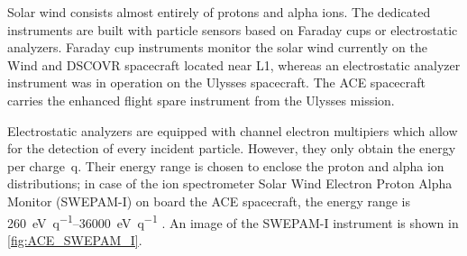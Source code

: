 Solar wind consists almost entirely of protons and alpha ions. The dedicated instruments are built with particle sensors based on Faraday cups or electrostatic analyzers. Faraday cup instruments monitor the solar wind currently on the Wind and DSCOVR spacecraft located near L1, whereas an electrostatic analyzer instrument was in operation on the Ulysses spacecraft. The ACE spacecraft carries the enhanced flight spare instrument from the Ulysses mission.

Electrostatic analyzers are equipped with channel electron multipiers which allow for the detection of every incident particle. However, they only obtain the energy per charge~q. Their energy range is chosen to enclose the proton and alpha ion distributions; in case of the ion spectrometer Solar Wind Electron Proton Alpha Monitor (SWEPAM-I) on board the ACE spacecraft, the energy range is \SIrange{260}{36000}{\electronvolt\per q} \citep{McComas1998a}. An image of the SWEPAM-I instrument is shown in \autoref{fig:ACE_SWEPAM_I}.
\begin{figure}[!b]
	\begin{floatrow}
	\end{floatrow}
\end{figure}

